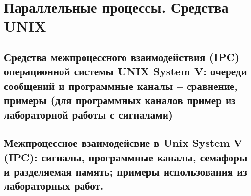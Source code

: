 \section{Параллельные процессы. Средства UNIX}

\subsection{Средства межпроцессного взаимодействия (IPC) операционной системы UNIX System V: очереди сообщений и программные каналы – сравнение, примеры (для программных каналов пример из лабораторной работы с сигналами)}

\newpage

\subsection{Межпроцессное взаимодейсвие в Unix System V (IPC): сигналы, программные каналы, семафоры и разделяемая память; примеры использования из лабораторных работ.}

